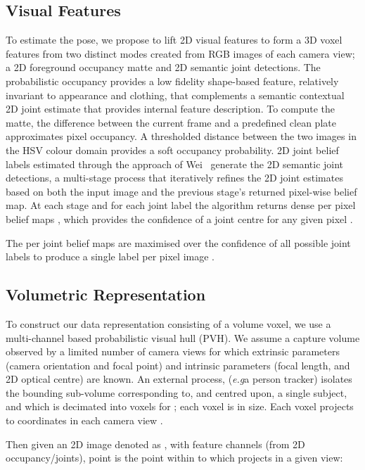 \documentclass{bmvc2k}
\newcommand{\squeezeup}{\vspace{-2mm}}
\newcommand{\eg}{e.\,g.\xspace}
\def\eg{\emph{e.g}\bmvaOneDot}
\begin{document}
\subsection{Visual Features }
\label{sec:2DDectections}
To estimate the pose, we propose to lift 2D visual features to form a 3D voxel features from two distinct modes created from RGB images of each camera view; a 2D foreground occupancy matte and 2D semantic joint detections. The probabilistic occupancy provides a low fidelity shape-based feature, relatively invariant to appearance and clothing, that complements a semantic contextual 2D joint estimate that provides internal feature description. To compute the matte, the difference between the current frame  and a predefined clean plate   approximates pixel occupancy. A thresholded  distance between the two images in the HSV colour domain provides a soft occupancy probability. 2D joint belief labels estimated through the approach of Wei~\cite{wei2016cpm,cao2017realtime} generate the 2D semantic joint detections, a multi-stage process that iteratively refines the 2D joint estimates based on both the input image and the previous stage’s returned pixel-wise belief map. At each stage  and for each joint label  the algorithm returns dense per pixel belief maps , which provides the confidence of a joint centre for any given pixel . 

The per joint belief maps are maximised over the confidence of all possible joint labels to produce a single label per pixel image . 
\squeezeup

\subsection{Volumetric Representation}
\label{sec:PVH}


To construct our data representation consisting of a volume voxel, we use a multi-channel based probabilistic visual hull (PVH). 
We assume a capture volume  observed by a limited number  of camera views  for which extrinsic parameters  (camera orientation and focal point) and intrinsic parameters  (focal length, and 2D optical centre) are known. An external process, (\eg a person tracker) isolates the bounding sub-volume   corresponding to, and centred upon, a single subject, and which  is decimated into voxels  for ; each voxel is  in size. Each voxel  projects to coordinates  in each camera view .

Then given an 2D image denoted as , with  feature channels (from 2D occupancy/joints), point  is the point within  to which  projects in a given view:
\end{document}
